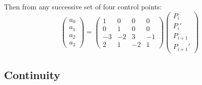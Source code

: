 \documentclass[11pt]{article}
\begin{document}
Then from any successive set of four control points:
\[
  \begin{pmatrix} a_0 \\ a_1 \\ a_2 \\ a_3 \end{pmatrix} =
  \begin{pmatrix}
    1 & 0 & 0 & 0 \\
    0 & 1 & 0 & 0 \\
    -3 & -2 & 3 & -1 \\
    2 & 1 & -2 & 1
  \end{pmatrix}
  \begin{pmatrix} P_i \\ P_i' \\ P_{i+1} \\ P_{i+1}' \end{pmatrix}
\]

\subsection{Continuity}
\end{document}
